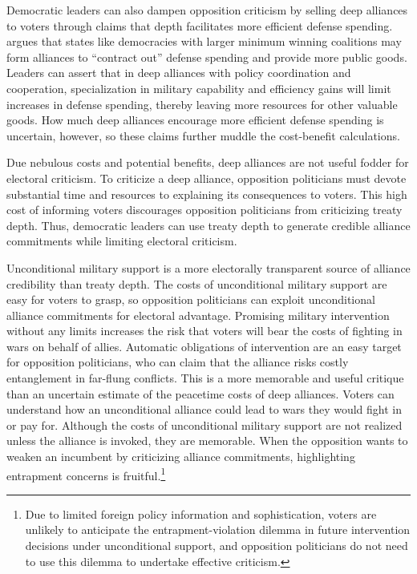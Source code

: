 \documentclass[12pt]{article}
\begin{document}
Democratic leaders can also dampen opposition criticism by selling deep alliances to voters through claims that depth facilitates more efficient defense spending. 
\citet{Kimball2010} argues that states like democracies with larger minimum winning coalitions may form alliances to ``contract out'' defense spending and provide more public goods. 
Leaders can assert that in deep alliances with policy coordination and cooperation, specialization in military capability and efficiency gains will limit increases in defense spending, thereby leaving more resources for other valuable goods.  
How much deep alliances encourage more efficient defense spending is uncertain, however, so these claims further muddle the cost-benefit calculations. 


Due nebulous costs and potential benefits, deep alliances are not useful fodder for electoral criticism.
To criticize a deep alliance, opposition politicians must devote substantial time and resources to explaining its consequences to voters.  
This high cost of informing voters discourages opposition politicians from criticizing treaty depth. 
Thus, democratic leaders can use treaty depth to generate credible alliance commitments while limiting electoral criticism. 


Unconditional military support is a more electorally transparent source of alliance credibility than treaty depth. 
The costs of unconditional military support are easy for voters to grasp, so opposition politicians can exploit unconditional alliance commitments for electoral advantage. 
Promising military intervention without any limits increases the risk that voters will bear the costs of fighting in wars on behalf of allies. 
Automatic obligations of intervention are an easy target for opposition politicians, who can claim that the alliance risks costly entanglement in far-flung conflicts.  
This is a more memorable and useful critique than an uncertain estimate of the peacetime costs of deep alliances. 
Voters can understand how an unconditional alliance could lead to wars they would fight in or pay for. 
Although the costs of unconditional military support are not realized unless the alliance is invoked, they are memorable.
When the opposition wants to weaken an incumbent by criticizing alliance commitments, highlighting entrapment concerns is fruitful.\footnote{Due to limited foreign policy information and sophistication, voters are unlikely to anticipate the entrapment-violation dilemma in future intervention decisions under unconditional support, and opposition politicians do not need to use this dilemma to undertake effective criticism.} 
\end{document}
